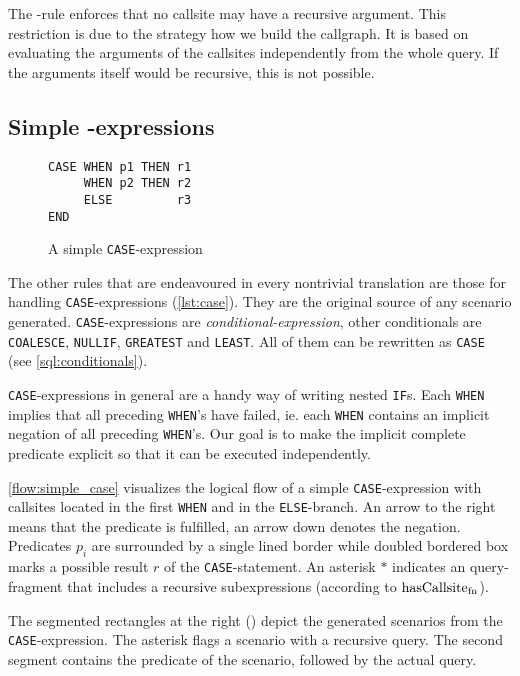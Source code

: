 The \RREC-rule enforces that no callsite may have a recursive argument. This restriction is due to the strategy how we build the callgraph. It is based on evaluating the arguments of the callsites independently from the whole query. If the arguments itself would be recursive, this is not possible.

\subsection{Simple \CASE-expressions}
\begin{wrapfigure}{r}{.3\textwidth}\centering
\begin{verbatim}
CASE WHEN p1 THEN r1
     WHEN p2 THEN r2
     ELSE         r3
END
\end{verbatim}
\caption{A simple \texttt{CASE}-expression}\vspace{-5mm} 
\label{lst:case}
\end{wrapfigure}

The other rules that are endeavoured in every nontrivial translation are those for handling \texttt{CASE}-expressions (\autoref{lst:case}). They are the original source of any scenario generated. \texttt{CASE}-expressions are \textit{conditional-expression}, other conditionals are \texttt{COALESCE}, \texttt{NULLIF}, \texttt{GREATEST} and \texttt{LEAST}. All of them can be rewritten as \texttt{CASE} (see \autoref{sql:conditionals}).

\texttt{CASE}-expressions in general are a handy way of writing nested \texttt{IF}s. Each \texttt{WHEN} implies that all preceding \texttt{WHEN}'s have failed, ie. each \texttt{WHEN} contains an implicit negation of all preceding \texttt{WHEN}'s. Our goal is to make the implicit complete predicate explicit so that it can be executed independently.

\autoref{flow:simple_case} visualizes the logical flow of a simple \texttt{CASE}-expression with callsites located in the first \texttt{WHEN} and in the \texttt{ELSE}-branch. An arrow to the right means that the predicate is fulfilled, an arrow down denotes the negation. Predicates $p_i$ are surrounded by a single lined border while doubled bordered box marks a possible result $r$ of the \texttt{CASE}-statement. An asterisk $\ast$ indicates an query-fragment that includes a recursive subexpressions (according to $\operatorname{\text{hasCallsite}_{fn}}$).

The segmented rectangles at the right (\label{scenarios:simple_case}) depict the generated scenarios from the \texttt{CASE}-expression. The asterisk flags a scenario with a recursive query. The second segment contains the predicate of the scenario, followed by the actual query.

